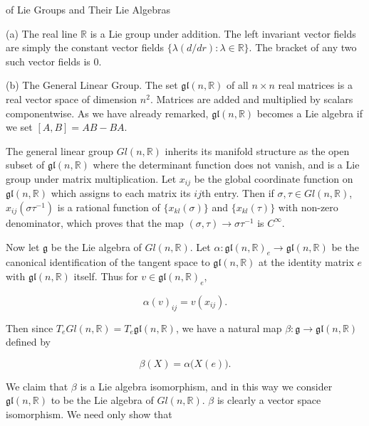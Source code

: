\begin{examples}{of Lie Groups and Their Lie Algebras}\label{thm:3.10}

(a) The real line  $ \mathbb{R} $ is a Lie group under addition. The left invariant vector fields are simply the constant vector fields  $ \{\lambda(d/dr): \lambda \in \mathbb{R}\} $. The bracket of any two such vector fields is 0.

(b) The General Linear Group. The set  $ \mathfrak{gl}(n, \mathbb{R}) $ of all  $ n \times n $ real matrices is a real vector space of dimension  $ n^2 $. Matrices are added and multiplied by scalars componentwise. As we have already remarked,  $ \mathfrak{gl}(n, \mathbb{R}) $ becomes a Lie algebra if we set  $ [A, B] = AB - BA $.

The general linear group $Gl(n,\mathbb{R})$ inherits its manifold structure as the open subset of $\mathfrak{gl}(n,\mathbb{R})$ where the determinant function does not vanish, and is a Lie group under matrix multiplication. Let $x_{ij}$ be the global coordinate function on $\mathfrak{gl}(n,\mathbb{R})$ which assigns to each matrix its $ij$th entry. Then if $\sigma, \tau \in Gl(n, \mathbb{R})$, $x_{ij}(\sigma\tau^{-1})$ is a rational function of $\{x_{kl}(\sigma)\}$ and $\{x_{kl}(\tau)\}$ with non-zero denominator, which proves that the map $(\sigma, \tau) \to \sigma\tau^{-1}$ is $C^\infty$.

Now let $\mathfrak{g}$ be the Lie algebra of $Gl(n,\mathbb{R})$. Let $\alpha: \mathfrak{gl}(n,\mathbb{R})_e \to \mathfrak{gl}(n,\mathbb{R})$ be the canonical identification of the tangent space to $\mathfrak{gl}(n,\mathbb{R})$ at the identity matrix $e$ with $\mathfrak{gl}(n,\mathbb{R})$ itself. Thus for $v \in \mathfrak{gl}(n,\mathbb{R})_e$,

\begin{equation}
\tag{1}\label{eq:3.10:1}
\alpha(v)_{i j}=v(x_{i j}).
\end{equation}

Then since $T_e Gl(n,\mathbb{R})=T_e\mathfrak{gl}(n,\mathbb{R})$, we have a natural map $\beta\colon\mathfrak{g}\to\mathfrak{gl}(n,\mathbb{R})$ defined by

\begin{equation}
\tag{2}\label{eq:3.10:2}
\beta(X)=\alpha\bigl(X(e)\bigr).
\end{equation}

We claim that $\beta$ is a Lie algebra isomorphism, and in this way we consider $\mathfrak{gl}(n,\mathbb{R})$ to be the Lie algebra of $Gl(n,\mathbb{R})$. $\beta$ is clearly a vector space isomorphism. We need only show that


\end{examples}
